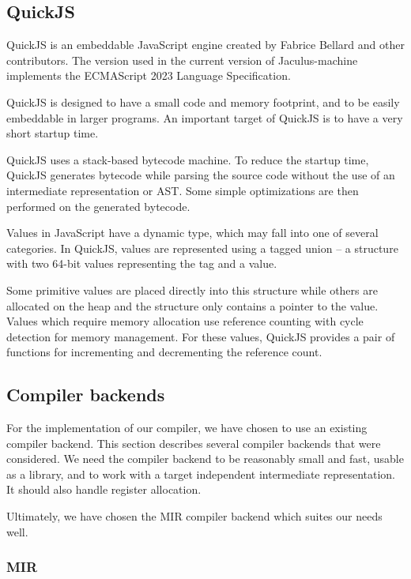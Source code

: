 \subsection{QuickJS}

QuickJS is an embeddable JavaScript engine created by Fabrice Bellard and other contributors\cite{quickjs}. The version used in the current version of Jaculus-machine implements the ECMAScript 2023 Language Specification\cite{ecma262}.

QuickJS is designed to have a small code and memory footprint, and to be easily embeddable in larger programs. An important target of QuickJS is to have a very short startup time.

QuickJS uses a stack-based bytecode machine. To reduce the startup time, QuickJS generates bytecode while parsing the source code without the use of an intermediate representation or AST. Some simple optimizations are then performed on the generated bytecode.

Values in JavaScript have a dynamic type, which may fall into one of several categories. In QuickJS, values are represented using a tagged union -- a structure with two 64-bit values representing the tag and a value.

Some primitive values are placed directly into this structure while others are allocated on the heap and the structure only contains a pointer to the value. Values which require memory allocation use reference counting with cycle detection for memory management. For these values, QuickJS provides a pair of functions for incrementing and decrementing the reference count.



\subsection{Compiler backends}

For the implementation of our compiler, we have chosen to use an existing compiler backend. This section describes several compiler backends that were considered. We need the compiler backend to be reasonably small and fast, usable as a library, and to work with a target independent intermediate representation. It should also handle register allocation.

Ultimately, we have chosen the MIR compiler backend which suites our needs well.


\subsubsection{MIR}

